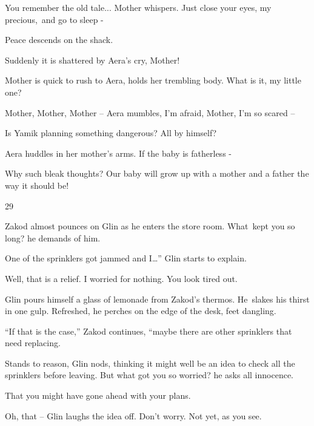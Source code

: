 \documentclass[twoside,11pt]{book}
\begin{document}
{\textquotedbl}You remember the old tale...{\textquotedbl} Mother whispers. {\textquotedbl}Just close your eyes, my
precious,~and go to sleep -{\textquotedbl} 

Peace descends on the shack. 

Suddenly it is shattered by Aera's cry, {\textquotedbl}Mother!{\textquotedbl} 

Mother is quick to rush to Aera, holds her trembling body. {\textquotedbl}What is it, my little one?{\textquotedbl} 

{\textquotedbl}Mother, Mother, Mother --{\textquotedbl} Aera mumbles, {\textquotedbl}I'm afraid, Mother, I'm so scared
--{\textquotedbl} 

{\textquotedbl}Is Yamik planning something dangerous? All by himself?{\textquotedbl} 

Aera huddles in her mother's arms. {\textquotedbl}If the baby is fatherless -{\textquotedbl}

{\textquotedbl}Why such bleak thoughts? Our baby will grow up with a mother and a father the way it should
be!{\textquotedbl}


\bigskip

29~~\ 

Zakod almost pounces on Glin as he enters the store room. {\textquotedbl}What\ kept you so long?{\textquotedbl} he
demands of him.\ 

{\textquotedbl}One of the sprinklers got jammed and I{\dots}{}'' Glin starts to explain. 

{\textquotedbl}Well, that is a relief. I worried for nothing. You look tired out.{\textquotedbl} 

Glin pours himself a glass of lemonade from Zakod's thermos. He{\ }slakes his
thirst in one gulp. Refreshed, he perches on the edge of the desk, feet dangling. 

{}``If that is the case,'' Zakod continues, ``maybe there are other sprinklers that need replacing.{\textquotedbl} 

{\textquotedbl}Stands to reason,{\textquotedbl} Glin nods, thinking it might well be an idea to check all the sprinklers
before leaving. {\textquotedbl}But what got you so worried?{\textquotedbl} he asks all innocence. 

{\textquotedbl}That you might have gone ahead with your plans.{\textquotedbl} 

{\textquotedbl}Oh, that -- {\textquotedbl} Glin laughs the idea off. {\textquotedbl}Don't worry. Not yet, as you
see.{\textquotedbl} 
\end{document}
